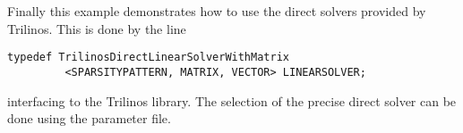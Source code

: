 Finally this example demonstrates how to use the direct solvers provided by Trilinos. 
This is done by the line 
\begin{verbatim}
typedef TrilinosDirectLinearSolverWithMatrix
         <SPARSITYPATTERN, MATRIX, VECTOR> LINEARSOLVER;
\end{verbatim}
interfacing to the Trilinos library. The selection of the precise direct solver can 
be done using the parameter file.
